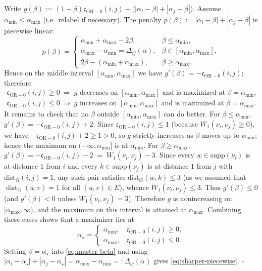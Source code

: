 \documentclass[twoside,11pt]{article}
\numberwithin{equation}{section}
\numberwithin{theorem}{section}
\numberwithin{example}{section}
\begin{document}
\noindent Write
\(
g(\beta):=(1-\beta)\mathfrak c_{\mathrm{OR}-0}(i,j) - \bigl(|\alpha_i-\beta|+|\alpha_j-\beta|\bigr).
\)
Assume $\alpha_{\min}\le \alpha_{\max}$ (i.e.\ relabel if necessary).
The penalty 
\(
p(\beta):=|\alpha_i-\beta|+|\alpha_j-\beta|
\)
is piecewise linear:
\[
p(\beta)=
\begin{cases}
\alpha_{\min}+\alpha_{\max}-2\beta, & \beta\le \alpha_{\min},\\
\alpha_{\max}-\alpha_{\min}=\Delta_{ij}(\alpha), & \beta\in[\alpha_{\min},\alpha_{\max}],\\
2\beta-(\alpha_{\min}+\alpha_{\max}), & \beta\ge \alpha_{\max}.
\end{cases}
\]
Hence on the middle interval $[\alpha_{\min},\alpha_{\max}]$ we have
$g'(\beta)=-\mathfrak c_{\mathrm{OR}-0}(i,j)$; therefore
\[
\begin{aligned}
\mathfrak c_{\mathrm{OR}-0}(i,j)\ge 0 \ \Rightarrow\ g \text{ decreases on }[\alpha_{\min},\alpha_{\max}] \text{ and is maximized at }\beta=\alpha_{\min},\\
\mathfrak c_{\mathrm{OR}-0}(i,j)\le 0 \ \Rightarrow\ g \text{ increases on }[\alpha_{\min},\alpha_{\max}] \text{ and is maximized at }\beta=\alpha_{\max}.
\end{aligned}
\]
It remains to check that no $\beta$ outside $[\alpha_{\min},\alpha_{\max}]$ can do better.
For $\beta\le \alpha_{\min}$,
\(
g'(\beta) = -\mathfrak c_{\mathrm{OR}-0}(i,j) + 2.
\)
Since $\mathfrak c_{\mathrm{OR}-0}(i,j)\le 1$ (because $W_1(\nu_i,\nu_j)\ge 0$), we have $-\mathfrak c_{\mathrm{OR}-0}(i,j)+2\ge 1>0$, so $g$ strictly increases as $\beta$ moves up to $\alpha_{\min}$; hence the maximum on $(-\infty,\alpha_{\min}]$ is at $\alpha_{\min}$.
For $\beta\ge \alpha_{\max}$,
\(
g'(\beta) = -\mathfrak c_{\mathrm{OR}-0}(i,j) - 2 \;=\; W_1(\nu_i,\nu_j)-3.
\)
Since every $w\in\mathrm{supp}(\nu_i)$ is at distance $1$ from $i$ and every $k\in\mathrm{supp}(\nu_j)$ is at distance $1$ from $j$ with $\mathrm{dist}_G(i,j)=1$, any such pair satisfies $\mathrm{dist}_G(w,k)\le 3$  (as we assumed that $\operatorname{dist}_G(u,v)=1$ for all $(u,v)\in E$), whence $W_1(\nu_i,\nu_j)\le 3$. Thus $g'(\beta)\le 0$ (and $g'(\beta)<0$ unless $W_1(\nu_i,\nu_j)=3$). Therefore $g$ is nonincreasing on $[\alpha_{\max},\infty)$, and the maximum on this interval is attained at $\alpha_{\max}$.  Combining these cases shows that a maximizer lies at
\[
\alpha_\star=
\begin{cases}
\alpha_{\min}, & \mathfrak c_{\mathrm{OR}-0}(i,j)\ge 0,\\
\alpha_{\max}, & \mathfrak c_{\mathrm{OR}-0}(i,j)\le 0.
\end{cases}
\]
Setting $\beta=\alpha_\star$ into \eqref{eq:master-beta} and using
$|\alpha_i-\alpha_\star|+|\alpha_j-\alpha_\star|=\alpha_{\max}-\alpha_{\min}\!=:\!\Delta_{ij}(\alpha)$
gives \eqref{eq:sharper-piecewise}.
\hfill$\square$
\end{document}
